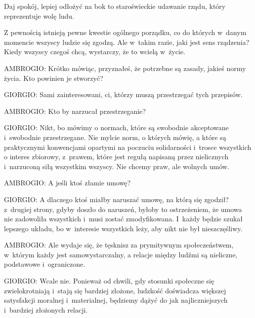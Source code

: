 \documentclass[oneside,polish,11pt,sfheadings]{mwbk}
\begin{document}
 
Daj spokój, lepiej odłożyć na bok to staroświeckie udawanie rządu, który reprezentuje wolę ludu. 

 
Z pewnością istnieją pewne kwestie ogólnego porządku, co do których w~danym momencie wszyscy ludzie się zgodzą. Ale w~takim razie, jaki jest sens rządzenia? Kiedy wszyscy czegoś chcą, wystarczy, że to wcielą w~życie. 




 
\noindent AMBROGIO: Krótko mówiąc, przyznałeś, że potrzebne są zasady, jakieś normy życia. Kto powinien je stworzyć? 




 
\noindent GIORGIO: Sami zainteresowani, ci, którzy muszą przestrzegać tych przepisów. 




 
\noindent AMBROGIO: Kto by narzucał przestrzeganie? 




 
\noindent GIORGIO: Nikt, bo mówimy o normach, które są swobodnie akceptowane i~swobodnie przestrzegane. Nie mylcie norm, o których
mówię, a które są praktycznymi konwencjami opartymi na poczuciu solidarności i~trosce wszystkich o interes zbiorowy, z~prawem, które jest regułą napisaną przez nielicznych i~narzuconą siłą wszystkim wszyscy. Nie chcemy praw, ale wolnych
umów. 




 
\noindent AMBROGIO: A jeśli ktoś złamie umowę? 




 
\noindent GIORGIO: A dlaczego ktoś miałby naruszać umowę, na którą się zgodził? z~drugiej strony, gdyby doszło do naruszeń, byłoby
to ostrzeżeniem, że umowa nie zadowoliła wszystkich i~musi zostać zmodyfikowana. I~każdy będzie szukał lepszego układu,
bo w~interesie wszystkich leży, aby nikt nie był nieszczęśliwy. 




 
\noindent AMBROGIO: Ale wydaje się, że tęsknisz za prymitywnym społeczeństwem, w~którym każdy jest samowystarczalny, a relacje
między ludźmi są nieliczne, podstawowe i~ograniczone. 




 
\noindent GIORGIO: Wcale nie. Ponieważ od chwili, gdy stosunki społeczne się zwielokrotniają i~stają się bardziej złożone,
ludzkość doświadcza większej satysfakcji moralnej i~materialnej, będziemy dążyć do jak najliczniejszych i~bardziej
złożonych relacji. 
\end{document}
